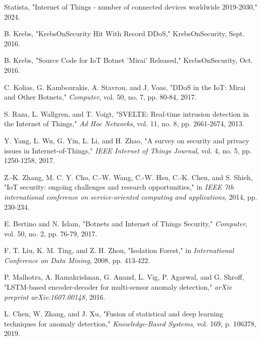 \documentclass[conference]{IEEEtran}
\begin{document}
\begin{thebibliography}{00}

 Statista, "Internet of Things - number of connected devices worldwide 2019-2030," 2024.

 B. Krebs, "KrebsOnSecurity Hit With Record DDoS," KrebsOnSecurity, Sept. 2016.

 B. Krebs, "Source Code for IoT Botnet 'Mirai' Released," KrebsOnSecurity, Oct. 2016.

 C. Kolias, G. Kambourakis, A. Stavrou, and J. Voas, "DDoS in the IoT: Mirai and Other Botnets," \textit{Computer}, vol. 50, no. 7, pp. 80-84, 2017.

 S. Raza, L. Wallgren, and T. Voigt, "SVELTE: Real-time intrusion detection in the Internet of Things," \textit{Ad Hoc Networks}, vol. 11, no. 8, pp. 2661-2674, 2013.

 Y. Yang, L. Wu, G. Yin, L. Li, and H. Zhao, "A survey on security and privacy issues in Internet-of-Things," \textit{IEEE Internet of Things Journal}, vol. 4, no. 5, pp. 1250-1258, 2017.

 Z.-K. Zhang, M. C. Y. Cho, C.-W. Wang, C.-W. Hsu, C.-K. Chen, and S. Shieh, "IoT security: ongoing challenges and research opportunities," in \textit{IEEE 7th international conference on service-oriented computing and applications}, 2014, pp. 230-234.

 E. Bertino and N. Islam, "Botnets and Internet of Things Security," \textit{Computer}, vol. 50, no. 2, pp. 76-79, 2017.

 F. T. Liu, K. M. Ting, and Z. H. Zhou, "Isolation Forest," in \textit{International Conference on Data Mining}, 2008, pp. 413-422.

 P. Malhotra, A. Ramakrishnan, G. Anand, L. Vig, P. Agarwal, and G. Shroff, "LSTM-based encoder-decoder for multi-sensor anomaly detection," \textit{arXiv preprint arXiv:1607.00148}, 2016.

 L. Chen, W. Zhang, and J. Xu, "Fusion of statistical and deep learning techniques for anomaly detection," \textit{Knowledge-Based Systems}, vol. 169, p. 106378, 2019.


\end{thebibliography}
\end{document}

